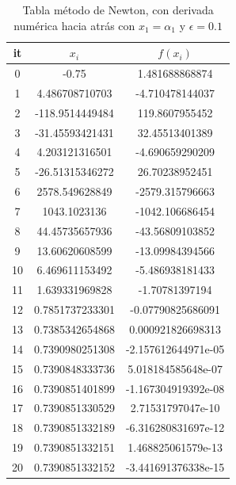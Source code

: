 \documentclass{article} %
\begin{document}
\begin{table}[H]
\centering
\begin{tabular}{|c|c|c|}
\hline
it & $x_i$ & $f(x_i)$\\
\hline
0 & -0.75 & 1.481688868874\\
1 & 4.486708710703 & -4.710478144037\\
2 & -118.9514449484 & 119.8607955452\\
3 & -31.45593421431 & 32.45513401389\\
4 & 4.203121316501 & -4.690659290209\\
5 & -26.51315346272 & 26.70238952451\\
6 & 2578.549628849 & -2579.315796663\\
7 & 1043.1023136 & -1042.106686454\\
8 & 44.45735657936 & -43.56809103852\\
9 & 13.60620608599 & -13.09984394566\\
10 & 6.469611153492 & -5.486938181433\\
11 & 1.639331969828 & -1.70781397194\\
12 & 0.7851737233301 & -0.07790825686091\\
13 & 0.7385342654868 & 0.000921826698313\\
14 & 0.7390980251308 & -2.157612644971e-05\\
15 & 0.7390848333736 & 5.018184585648e-07\\
16 & 0.7390851401899 & -1.167304919392e-08\\
17 & 0.7390851330529 & 2.71531797047e-10\\
18 & 0.7390851332189 & -6.316280831697e-12\\
19 & 0.7390851332151 & 1.468825061579e-13\\
20 & 0.7390851332152 & -3.441691376338e-15\\
\hline
\end{tabular}
\caption{Tabla método de Newton, con derivada numérica hacia atrás con $x_1 = \alpha_1$ y $\epsilon = 0.1$}
\end{table}
\end{document}
